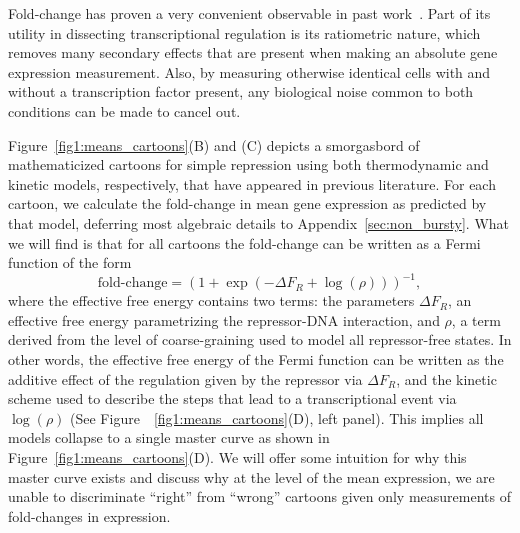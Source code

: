 Fold-change has proven a very convenient observable in past
work~\cite{Garcia2011a, Brewster2014, Razo-Mejia2018, Chure2019}. Part of its
utility in dissecting transcriptional regulation is its ratiometric nature,
which removes many secondary effects that are present when making an absolute
gene expression measurement. Also, by measuring otherwise identical cells with
and without a transcription factor present, any biological noise common to both
conditions can be made to cancel out.

Figure~\ref{fig1:means_cartoons}(B) and (C) depicts a smorgasbord of
mathematicized cartoons for simple repression using both thermodynamic and
kinetic models, respectively, that have appeared in previous literature. For
each cartoon, we calculate the fold-change in mean gene expression as predicted
by that model, deferring most algebraic details to
Appendix~\ref{sec:non_bursty}. What we will find is that for all cartoons the
fold-change can be written as a Fermi function of the form
\begin{equation}
 \text{fold-change} = \left( 1 + \exp(-\Delta F_R + \log(\rho))  \right)^{-1},
 \label{eq:deltaFR_eq_noneq_equiv}
\end{equation}
where the effective free energy contains two terms: the parameters $\Delta F_R$,
an effective free energy parametrizing the repressor-DNA interaction, and
$\rho$, a term derived from the level of coarse-graining used to model all
repressor-free states. In other words, the effective free energy of the Fermi
function can be written as the additive effect of the regulation given by the
repressor via $\Delta F_R$, and the kinetic scheme used to describe the steps
that lead to a transcriptional event via $\log(\rho)$ (See
Figure~~\ref{fig1:means_cartoons}(D), left panel). This implies all models
collapse to a single master curve as shown in
Figure~\ref{fig1:means_cartoons}(D). We will offer some intuition for why this
master curve exists and discuss why at the level of the mean expression, we are
unable to discriminate ``right'' from ``wrong'' cartoons given only measurements
of fold-changes in expression.


